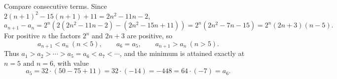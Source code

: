 Compare consecutive terms. Since $2(n+1)^2-15(n+1)+11=2n^2-11n-2$,
\[a_{n+1}-a_n=2^n\left(2\left(2n^2-11n-2\right)-\left(2n^2-15n+11\right)\right)=2^n\left(2n^2-7n-15\right)=2^n(2n+3)(n-5).\]
For positive $n$ the factors $2^n$ and $2n+3$ are positive, so
\[a_{n+1}<a_n\ (n<5),\qquad a_6=a_5,\qquad a_{n+1}>a_n\ (n>5).\]
Thus $a_1>a_2>\cdots>a_5=a_6<a_7<\cdots$, and the minimum is attained exactly at $\boxed{n=5\text{ and }n=6}$, with value
\[a_5=32\cdot(50-75+11)=32\cdot(-14)=\boxed{-448}=64\cdot(-7)=a_6.\]
